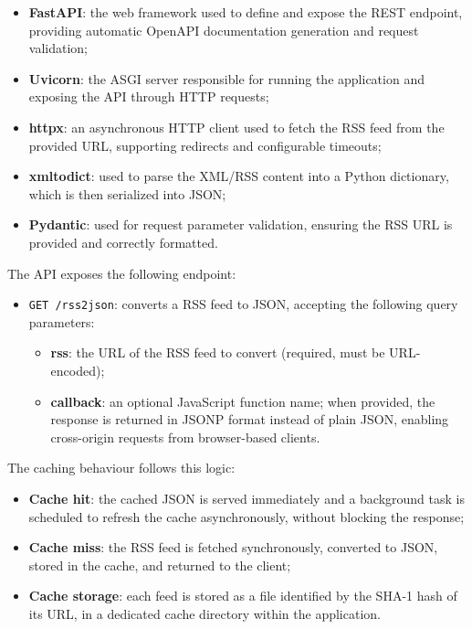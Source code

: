 \documentclass[12pt, a4paper]{report}
\begin{document}
\begin{itemize}
    \item \textbf{FastAPI}: the web framework used to define and expose the REST endpoint,
          providing automatic OpenAPI documentation generation and request validation;
    \item \textbf{Uvicorn}: the ASGI server responsible for running the application and
          exposing the API through HTTP requests;
    \item \textbf{httpx}: an asynchronous HTTP client used to fetch the RSS feed from
          the provided URL, supporting redirects and configurable timeouts;
    \item \textbf{xmltodict}: used to parse the XML/RSS content into a Python dictionary,
          which is then serialized into JSON;
    \item \textbf{Pydantic}: used for request parameter validation, ensuring the RSS URL
          is provided and correctly formatted.
\end{itemize}

The API exposes the following endpoint:

\begin{itemize}
      \item \texttt{GET /rss2json}: converts a RSS feed to JSON, accepting the following
          query parameters:
    \begin{itemize}
        \item \textbf{rss}: the URL of the RSS feed to convert (required, must be URL-encoded);
        \item \textbf{callback}: an optional JavaScript function name; when provided,
              the response is returned in JSONP format instead of plain JSON, enabling
              cross-origin requests from browser-based clients.
    \end{itemize}
\end{itemize}

The caching behaviour follows this logic:

\begin{itemize}
    \item \textbf{Cache hit}: the cached JSON is served immediately and a background
          task is scheduled to refresh the cache asynchronously, without blocking the response;
    \item \textbf{Cache miss}: the RSS feed is fetched synchronously, converted to JSON,
          stored in the cache, and returned to the client;
    \item \textbf{Cache storage}: each feed is stored as a file identified by the
          SHA-1 hash of its URL, in a dedicated cache directory within the application.
\end{itemize}
\end{document}
